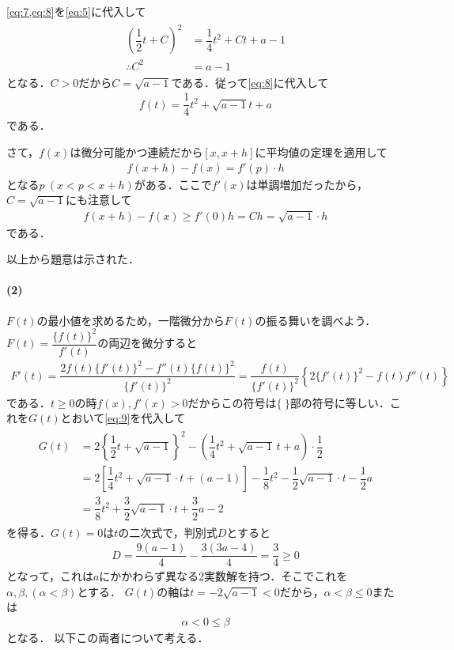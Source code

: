 \documentclass[../../main.tex]{subfiles}
\begin{document}
\cref{eq:7,eq:8}を\cref{eq:5}に代入して
\begin{align}
  \begin{split}
    \left(\dfrac{1}{2}t+C\right)^2&=\dfrac{1}{4}t^2+Ct+a-1 \\
    \therefore
    C^2&=a-1
  \end{split}
\end{align}
となる．$C>0$だから$C=\sqrt{a-1}$である．従って\cref{eq:8}に代入して
\begin{align}
  f(t)=\dfrac{1}{4}t^2+\sqrt{a-1}t+a \label{eq:9}
\end{align}
である．

さて，$f(x)$は微分可能かつ連続だから$[x,x+h]$に平均値の定理を適用して
\begin{align}
  f(x+h)-f(x)=f'(p)\cdot h
\end{align}
となる$p\ (x<p<x+h)$がある．ここで$f'(x)$は単調増加だったから，$C=\sqrt{a-1}$にも注意して
\begin{align}
  f(x+h)-f(x)\ge f'(0)h = Ch = \sqrt{a-1}\cdot h
\end{align}
である．

以上から題意は示された．

\paragraph{(2)}

$F(t)$の最小値を求めるため，一階微分から$F(t)$の振る舞いを調べよう．
$F(t)=\dfrac{\{f(t)\}^2}{f'(t)}$の両辺を微分すると
\begin{align}
  F'(t)=\dfrac{2f(t)\{f'(t)\}^2-f''(t)\{f(t)\}^2}{\{f'(t)\}^2} = \dfrac{f(t)}{\{f'(t)\}^2}\left\{2\{f'(t)\}^2-f(t)f''(t)\right\}
\end{align}
である．$t\ge 0$の時$f(x), f'(x)>0$だからこの符号は$\{\ \}$部の符号に等しい．これを$G(t)$とおいて\cref{eq:9}を代入して
\begin{align}
  \begin{split}
    G(t)
    &=2\left\{\dfrac{1}{2}t+\sqrt{a-1}\right\}^2-\left(\dfrac{1}{4}t^2+\sqrt{a-1}\,t+a\right)\cdot\dfrac{1}{2} \\
    &=2\left[\dfrac{1}{4}t^2+\sqrt{a-1}\cdot t+(a-1)\right]-\dfrac{1}{8}t^2-\dfrac{1}{2}\sqrt{a-1}\cdot t-\dfrac{1}{2}a \\
    &=\dfrac{3}{8}t^2+\dfrac{3}{2}\sqrt{a-1}\cdot t+\dfrac{3}{2}a-2
  \end{split}
\end{align}
を得る．$G(t)=0$は$t$の二次式で，判別式$D$とすると
\begin{align}
  D = \dfrac{9(a-1)}{4} - \dfrac{3(3a-4)}{4} = \dfrac{3}{4} \ge 0
\end{align}
となって，これは$a$にかかわらず異なる2実数解を持つ．そこでこれを$\alpha,\beta, (\alpha<\beta)$とする．
$G(t)$の軸は$t=-2\sqrt{a-1}<0$だから，$\alpha<\beta\le0$または
\begin{align}
  \alpha<0\le\beta
\end{align}
となる．
以下この両者について考える．
\end{document}
